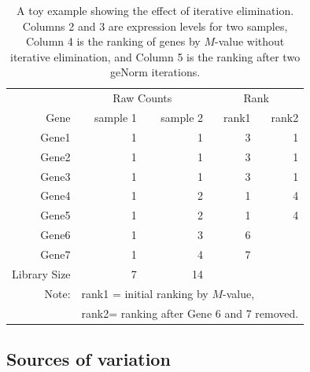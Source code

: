 \documentclass[letterpaper,12pt]{article}
\begin{document}
 
\begin{table}[ht] \centering \caption{A toy example showing the effect of iterative elimination. Columns 2 and 3 are expression levels for two samples, Column 4 is the ranking of genes by $M$-value without iterative elimination, and Column 5 is the ranking after two geNorm iterations.} \begin{tabular}{rrrrr}
    \hline & \multicolumn{2}{c}{Raw Counts} & \multicolumn{2}{c}{Rank}\\
     Gene & sample 1 & sample 2 & rank1 & rank2 \\ \hline 
    Gene1 & 1 & 1 & 3 & 1 \\ 
    Gene2 & 1 & 1 & 3 & 1 \\ 
    Gene3 & 1 & 1 & 3 & 1 \\
     Gene4 & 1 & 2 & 1 & 4 \\ 
     Gene5 & 1 & 2 & 1 & 4 \\ 
     Gene6 & 1 & 3 & 6 &  \\ 
    Gene7 & 1 & 4 & 7 &  \\ \hline 
    Library Size & 7 & 14 & & 	\\ \hline 
    Note: &\multicolumn{4}{l}{ rank1 = initial ranking by $M$-value, } \\
    & \multicolumn{4}{l}{ rank2= ranking after Gene 6 and 7 removed.}
\end{tabular} \label{table:toyexample} \end{table}







\subsection{Sources of variation}\label{Section:varianceComp}
\end{document}
